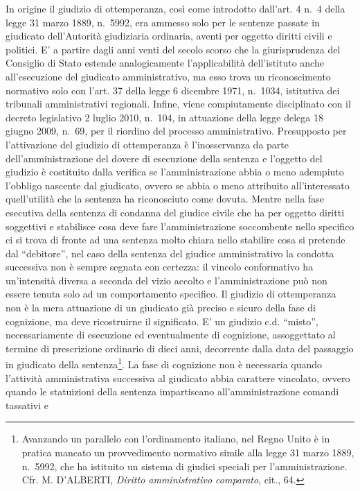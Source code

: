 \documentclass[12pt,it,a4paper,]{report}
\begin{document}
In origine il giudizio di ottemperanza, così come introdotto dall'art. 4
n.~4 della legge 31 marzo 1889, n.~5992, era ammesso solo per le
sentenze passate in giudicato dell'Autorità giudiziaria ordinaria,
aventi per oggetto diritti civili e politici. E' a partire dagli anni
venti del secolo scorso che la giurisprudenza del Consiglio di Stato
estende analogicamente l'applicabilità dell'istituto anche
all'esecuzione del giudicato amministrativo, ma esso trova un
riconoscimento normativo solo con l'art. 37 della legge 6 dicembre 1971,
n.~1034, istitutiva dei tribunali amministrativi regionali. Infine,
viene compiutamente disciplinato con il decreto legislativo 2 luglio
2010, n.~104, in attuazione della legge delega 18 giugno 2009, n.~69,
per il riordino del processo amministrativo. Presupposto per
l'attivazione del giudizio di ottemperanza è l'inosservanza da parte
dell'amministrazione del dovere di esecuzione della sentenza e l'oggetto
del giudizio è costituito dalla verifica se l'amministrazione abbia o
meno adempiuto l'obbligo nascente dal giudicato, ovvero se abbia o meno
attribuito all'interessato quell'utilità che la sentenza ha riconosciuto
come dovuta. Mentre nella fase esecutiva della sentenza di condanna del
giudice civile che ha per oggetto diritti soggettivi e stabilisce cosa
deve fare l'amministrazione soccombente nello specifico ci si trova di
fronte ad una sentenza molto chiara nello stabilire cosa si pretende dal
``debitore'', nel caso della sentenza del giudice amministrativo la
condotta successiva non è sempre segnata con certezza: il vincolo
conformativo ha un'intensità diversa a seconda del vizio accolto e
l'amministrazione può non essere tenuta solo ad un comportamento
specifico. Il giudizio di ottemperanza non è la mera attuazione di un
giudicato già preciso e sicuro della fase di cognizione, ma deve
ricostruirne il significato. E' un giudizio c.d. ``misto'',
necessariamente di esecuzione ed eventualmente di cognizione,
assoggettato al termine di prescrizione ordinario di dieci anni,
decorrente dalla data del passaggio in giudicato della
sentenza\footnote{Avanzando un parallelo con l'ordinamento italiano, nel
  Regno Unito è in pratica mancato un provvedimento normativo simile
  alla legge 31 marzo 1889, n.~5992, che ha istituito un sistema di
  giudici speciali per l'amministrazione. Cfr. M. D'ALBERTI,
  \emph{Diritto amministrativo comparato}, cit., 64.}. La fase di
cognizione non è necessaria quando l'attività amministrativa successiva
al giudicato abbia carattere vincolato, ovvero quando le statuizioni
della sentenza impartiscano all'amministrazione comandi tassativi e
\end{document}
